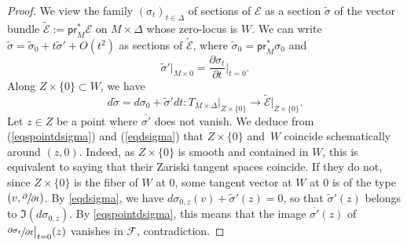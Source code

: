 \documentclass[11pt]{article}
\let\mathcal\mathscr
\theoremstyle{definition}
\newcommand\cE{\mathcal{E}}
\newcommand\cF{\mathcal{F}}
\newcommand{\pr}{\mathsf{pr}}
\begin{document}
\begin{proof}
We view the family $(\sigma_t)_{t\in \Delta}$ of sections of $\cE$ as a section $\widetilde\sigma$
of the vector bundle $\widetilde{\cE}:=\pr_M^* \cE$
on $M\times \Delta$ whose zero-locus is $W$. We can write $\widetilde\sigma=\widetilde\sigma_0+t\widetilde\sigma'+O(t^2)$ as sections of $\widetilde{\cE}$, where
$\widetilde\sigma_0=\pr_M^*\sigma_0$ and
\begin{equation}\label{eqspointdsigma}
\widetilde \sigma'\vert_{ M\times 0}=\frac{\partial\sigma_t}{\partial t}\Big\vert_{t=0}
.
\end{equation}
Along $Z\times \{0\}\subset W $, we have
\begin{equation}\label{eqdsigma}
d\widetilde\sigma=d \sigma_0+\widetilde\sigma' dt\colon T_{M\times\Delta}\vert_{Z\times \{0\}} \to \widetilde{\cE}\vert_{Z\times \{0\}}.
\end{equation}
Let $z\in Z$ be a point where $\overline {\sigma'} $ does not vanish. We deduce from (\ref{eqspointdsigma}) and (\ref{eqdsigma}) that $Z\times \{0\}$ and~$W$ coincide schematically around $(z,0)$. Indeed, as $Z\times \{0\}$ is smooth and contained in $W$, this is equivalent to saying that their Zariski tangent spaces
coincide. If they do not, since $Z\times \{0\}$ is the fiber of $W$ at $0$, some tangent vector at $W$ at $0$ is of the type $ (v,\sfrac{\partial}{\partial t})$. By \eqref{eqdsigma}, we have
$d \sigma_{0,z}(v)+\widetilde\sigma'(z)=0$, so that $\widetilde\sigma'(z)$ belongs to $\Im (d \sigma_{0,z})$. By \eqref{eqspointdsigma}, this means that the image $\overline {\sigma'} (z) $ of
$\sfrac{\partial\sigma_t}{\partial t}\big\vert_{t=0}(z)$ vanishes in $\cF$, contradiction.


\end{proof}
\end{document}
